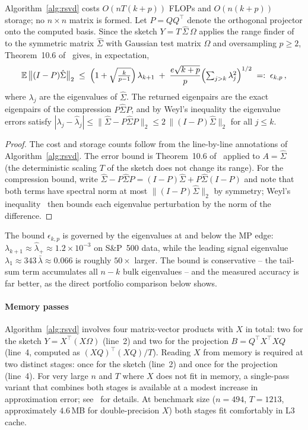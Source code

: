 \begin{proposition}\label{prop:rsvd}
Algorithm~\ref{alg:rsvd} costs $O(nT(k+p))$ FLOPs and $O(n(k+p))$ storage; no
$n \times n$ matrix is formed. Let $P = QQ^\top$ denote the orthogonal
projector onto the computed basis. Since the sketch $Y = T\,\hat\Sigma\,\Omega$
applies the range finder of~\cite{halko2011} to the symmetric matrix
$\hat\Sigma$ with Gaussian test matrix $\Omega$ and oversampling $p \geq 2$,
Theorem~10.6 of~\cite{halko2011} gives, in expectation,
\[
  \mathbb{E}\,\bigl\lVert (I - P)\hat\Sigma \bigr\rVert_2
  \;\leq\;
  \Bigl(1 + \sqrt{\tfrac{k}{p-1}}\Bigr)\,\lambda_{k+1}
  \;+\; \frac{e\sqrt{k+p}}{p}\Bigl(\textstyle\sum_{j>k}\lambda_j^2\Bigr)^{1/2}
  \;=:\; \epsilon_{k,p}\,,
\]
where $\lambda_j$ are the eigenvalues of $\hat\Sigma$. The returned eigenpairs
are the exact eigenpairs of the compression $P\hat\Sigma P$, and by Weyl's
inequality the eigenvalue errors satisfy
$|\lambda_j - \hat\lambda_j| \leq \lVert\hat\Sigma - P\hat\Sigma P\rVert_2
 \leq 2\,\lVert (I-P)\hat\Sigma \rVert_2$ for all $j \leq k$.
\end{proposition}

\begin{proof}
The cost and storage counts follow from the line-by-line annotations of
Algorithm~\ref{alg:rsvd}. The error bound is Theorem~10.6
of~\cite{halko2011} applied to $A = \hat\Sigma$ (the deterministic scaling $T$
of the sketch does not change its range). For the compression bound, write
$\hat\Sigma - P\hat\Sigma P = (I-P)\hat\Sigma + P\hat\Sigma(I-P)$ and note that
both terms have spectral norm at most $\lVert(I-P)\hat\Sigma\rVert_2$ by
symmetry; Weyl's inequality~\cite{hornjohnson2013} then bounds each eigenvalue
perturbation by the norm of the difference.
\end{proof}

The bound $\epsilon_{k,p}$ is governed by the eigenvalues at and below the MP
edge: $\lambda_{k+1} \approx \hat\lambda_+ \approx 1.2 \times 10^{-3}$ on
S\&P~500 data, while the leading signal eigenvalue
$\lambda_1 \approx 343\,\bar\lambda \approx 0.066$ is roughly $50\times$ larger.
The bound is conservative -- the tail-sum term accumulates all $n - k$ bulk
eigenvalues -- and the measured accuracy is far better, as the direct
portfolio comparison below shows.

\paragraph{Memory passes}
Algorithm~\ref{alg:rsvd} involves four matrix-vector products with $X$ in total:
two for the sketch $Y = X^\top(X\Omega)$ (line~2) and two for the projection
$B = Q^\top X^\top XQ$ (line~4, computed as $(XQ)^\top(XQ)/T$). Reading $X$
from memory is required at two distinct stages: once for the sketch (line~2)
and once for the projection (line~4). For very large $n$ and $T$ where $X$
does not fit in memory, a single-pass variant that combines both stages is
available at a modest increase in approximation error; see~\cite{halko2011}
for details. At benchmark size ($n=494$, $T=1213$, approximately $4.6$\,MB
for double-precision $X$) both stages fit comfortably in L3 cache.

